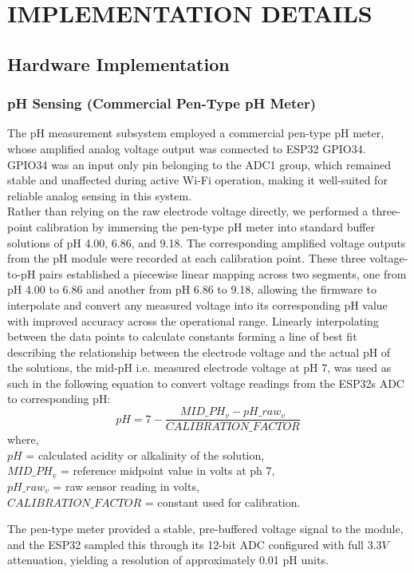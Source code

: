 \chapter{IMPLEMENTATION DETAILS}
\section{Hardware Implementation}
\subsection{pH Sensing (Commercial Pen-Type pH Meter)}
The pH measurement subsystem employed a commercial pen-type pH meter, whose amplified analog voltage output was connected to ESP32 GPIO34. GPIO34 was an input only pin belonging to the ADC1 group, which remained stable and unaffected during active Wi-Fi operation, making it well-suited for reliable analog sensing in this system.\\[8pt]
Rather than relying on the raw electrode voltage directly, we performed a three-point calibration by immersing the pen-type pH meter into standard buffer solutions of pH 4.00, 6.86, and 9.18. The corresponding amplified voltage outputs from the pH module were recorded at each calibration point. These three voltage-to-pH pairs established a piecewise linear mapping across two segments, one from pH 4.00 to 6.86 and another from pH 6.86 to 9.18, allowing the firmware to interpolate and convert any measured voltage into its corresponding pH value with improved accuracy across the operational range. Linearly interpolating between the data points to calculate constants forming a line of best fit describing the relationship between the electrode voltage and the actual pH of the solutions, the mid-pH i.e. measured electrode voltage at pH 7, was used as such in the following equation to convert voltage readings from the ESP32s ADC to corresponding pH:
\begin{equation}
pH = 7 - \frac{MID\_PH_v - pH\_raw_v}{CALIBRATION\_FACTOR}
\end{equation}
where,\\
$pH$ = calculated acidity or alkalinity of the solution, \\
$MID\_PH_v$ = reference midpoint value in volts at ph 7, \\
$pH\_raw_v$ = raw sensor reading in volts,\\
$CALIBRATION\_FACTOR$ = constant used for calibration.

The pen-type meter provided a stable, pre-buffered voltage signal to the module, and the ESP32 sampled this through its 12-bit ADC configured with full $3.3V$ attenuation, yielding a resolution of approximately 0.01 pH units.

